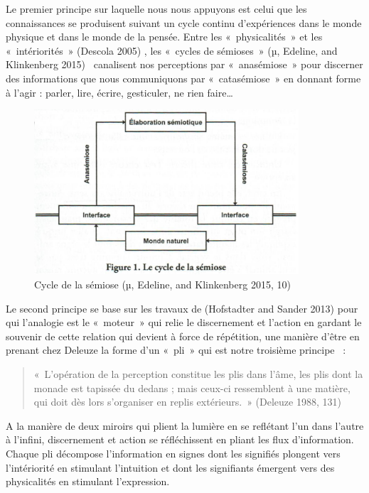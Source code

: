 \documentclass[
  letterpaper,
  DIV=11,
  numbers=noendperiod]{scrreprt}
\begin{document}
Le premier principe sur laquelle nous nous appuyons est celui que les
connaissances se produisent suivant un cycle continu d'expériences dans
le monde physique et dans le monde de la pensée. Entre les
«~physicalités~» et les «~intériorités~» (Descola 2005) , les «~cycles
de sémioses~» (µ, Edeline, and Klinkenberg 2015)~ canalisent nos
perceptions par «~anasémiose~» pour discerner des informations que nous
communiquons par «~catasémiose~» en donnant forme à l'agir : parler,
lire, écrire, gesticuler, ne rien faire\ldots{}

\begin{figure}

{\centering \includegraphics[width=9.855cm,height=6.145cm]{media/100000010000048C000002D6F38927B016A358A1.png}

}

\caption{\label{fig-cyclesemiose}Cycle de la sémiose (µ, Edeline, and
Klinkenberg 2015, 10)}

\end{figure}

Le second principe se base sur les travaux de (Hofstadter and Sander
2013) pour qui l'analogie est le «~moteur~» qui relie le discernement et
l'action en gardant le souvenir de cette relation qui devient à force de
répétition, une manière d'être en prenant chez Deleuze la forme d'un
«~pli~» qui est notre troisième principe ~:

\begin{quote}
«~L'opération de la perception constitue les plis dans l'âme, les plis
dont la monade est tapissée du dedans ; mais ceux-ci ressemblent à une
matière, qui doit dès lors s'organiser en replis extérieurs.~» (Deleuze
1988, 131)
\end{quote}

A la manière de deux miroirs qui plient la lumière en se reflétant l'un
dans l'autre à l'infini, discernement et action se réfléchissent en
pliant les flux d'information. Chaque pli décompose l'information en
signes dont les signifiés plongent vers l'intériorité en stimulant
l'intuition et dont les signifiants émergent vers des physicalités en
stimulant l'expression.
\end{document}
